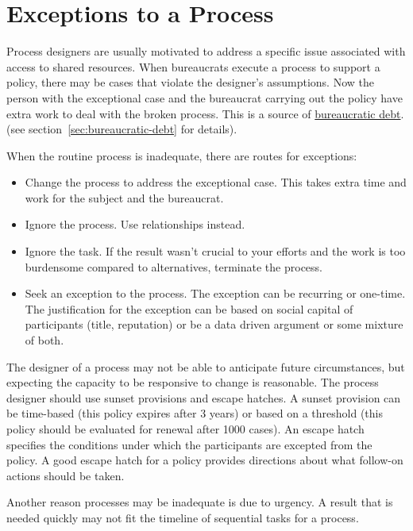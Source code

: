 \section{Exceptions to a Process\label{sec:exceptions-to-process}}


Process designers are usually motivated to address a specific issue associated with access to shared resources. When bureaucrats execute a process to support a policy, there may be cases that violate the designer's assumptions. Now the person with the exceptional case and the bureaucrat carrying out the policy have extra work to deal with the broken process. This is a source of \hyperref[sec:bureaucratic-debt]{bureaucratic debt}. 
\ifsectionref
(see section~\ref{sec:bureaucratic-debt} for details). 
\fi

When the routine process is inadequate, there are routes for exceptions:
\begin{itemize}
    \item Change the process to address the exceptional case. This takes extra time and work for the subject and the bureaucrat.
    \item Ignore the process. Use relationships instead.
    \item Ignore the task. If the result wasn't crucial to your efforts and the work is too burdensome compared to alternatives, terminate the process.
    \item Seek an exception to the process. The exception can be recurring or one-time. The justification for the exception can be based on social capital of participants (title, reputation) or be a data driven argument or some mixture of both.
\end{itemize}

The designer of a process may not be able to anticipate future circumstances, but expecting the capacity to be responsive to change is reasonable. The process designer should use sunset provisions and escape hatches.  
A sunset provision can be time-based (this policy expires after 3 years) or based on a threshold (this policy should be evaluated for renewal after 1000 cases). An escape hatch specifies the conditions under which the participants are excepted from the policy. A good escape hatch for a policy provides directions about what follow-on actions should be taken.

Another reason processes may be inadequate is due to urgency. A result that is needed quickly may not fit the timeline of sequential tasks for a process.

